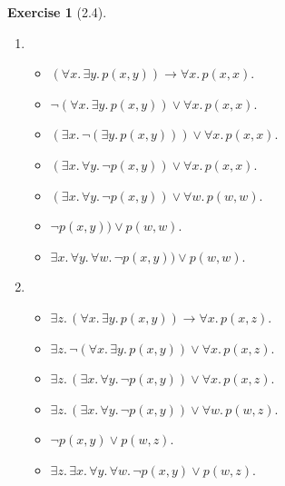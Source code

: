 \documentclass[12pt, psamsfonts]{amsart}
\theoremstyle{definition}
\newtheorem*{exer}{Exercise}
\theoremstyle{remark}
\numberwithin{equation}{subsection}
\begin{document}
\begin{exer}[2.4]
    $ $
    \begin{enumerate}[label=(\alph*)]
        \item %
            \begin{itemize}
                \item
                    $(\forall x.\, \exists y.\, p(x, y)) \rightarrow \forall x.\, p(x, x)$.
                \item
                    $\neg (\forall x.\, \exists y.\, p(x, y)) \lor \forall x.\, p(x, x)$.
                \item
                    $(\exists x.\, \neg(\exists y.\, p(x, y))) \lor \forall x.\, p(x, x)$.
                \item
                    $(\exists x.\, \forall y.\, \neg p(x, y)) \lor \forall x.\, p(x, x)$.
                \item
                    $(\exists x.\, \forall y.\, \neg p(x, y)) \lor \forall w.\, p(w, w)$.
                \item
                    $\neg p(x, y)) \lor p(w, w)$.
                \item
                    $\exists x.\, \forall y.\, \forall w.\, \neg p(x, y)) \lor p(w, w)$.
            \end{itemize}
        \item %
            \begin{itemize}
                \item
                    $\exists z.\, (\forall x.\, \exists y.\, p(x, y)) \rightarrow \forall x.\, p(x, z)$.
                \item
                    $\exists z.\, \neg(\forall x.\, \exists y.\, p(x, y)) \lor \forall x.\, p(x, z)$.
                \item
                    $\exists z.\, (\exists x.\, \forall y.\, \neg p(x, y)) \lor \forall x.\, p(x, z)$.
                \item
                    $\exists z.\, (\exists x.\, \forall y.\, \neg p(x, y)) \lor \forall w.\, p(w, z)$.
                \item
                    $\neg p(x, y) \lor p(w, z)$.
                \item
                    $\exists z.\, \exists x.\, \forall y.\, \forall w.\, \neg p(x, y) \lor p(w, z)$.
            \end{itemize}
    \end{enumerate}
\end{exer}
\end{document}

